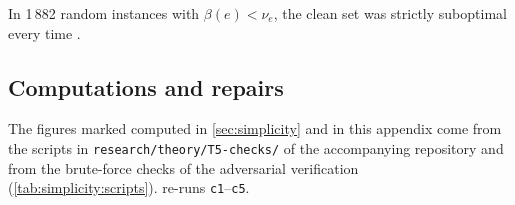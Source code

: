 In 1\,882 random instances with $\beta(e)<\nu_e$, the clean set was strictly suboptimal every time .

\subsection{Computations and repairs}\label{app:simplicity:scripts}

The figures marked \textsf{computed} in \cref{sec:simplicity} and in this appendix come from the scripts in \texttt{research/theory/T5-checks/} of the accompanying repository and from the brute-force checks of the adversarial verification (\cref{tab:simplicity:scripts}).  re-runs \texttt{c1}--\texttt{c5}.


